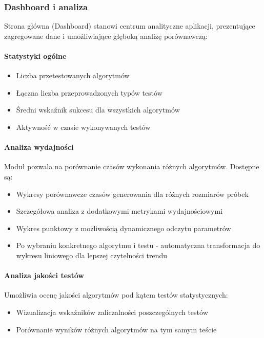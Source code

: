 \documentclass[12pt,a4paper]{article}
\begin{document}
\subsubsection{Dashboard i analiza}

Strona główna (Dashboard) stanowi centrum analityczne aplikacji, prezentujące zagregowane dane i umożliwiające głęboką analizę porównawczą:

\paragraph{Statystyki ogólne}
\begin{itemize}
    \item Liczba przetestowanych algorytmów
    \item Łączna liczba przeprowadzonych typów testów
    \item Średni wskaźnik sukcesu dla wszystkich algorytmów
    \item Aktywność w czasie wykonywanych testów
\end{itemize}

\paragraph{Analiza wydajności}
Moduł pozwala na porównanie czasów wykonania różnych algorytmów. Dostępne są:
\begin{itemize}
    \item Wykresy porównawcze czasów generowania dla różnych rozmiarów próbek
    \item Szczegółowa analiza z dodatkowymi metrykami wydajnościowymi
    \item Wykres punktowy z możliwością dynamicznego odczytu parametrów
    \item Po wybraniu konkretnego algorytmu i testu - automatyczna transformacja do wykresu liniowego dla lepszej czytelności trendu
\end{itemize}

\paragraph{Analiza jakości testów}
Umożliwia ocenę jakości algorytmów pod kątem testów statystycznych:
\begin{itemize}
    \item Wizualizacja wskaźników zaliczalności poszczególnych testów
    \item Porównanie wyników różnych algorytmów na tym samym teście
\end{itemize}
\end{document}
